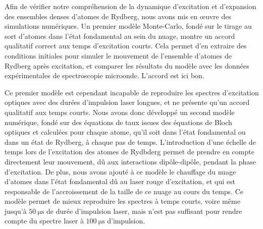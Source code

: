 Afin de vérifier notre compréhension de la dynamique d'excitation et d'expansion des ensembles denses d'atomes de Rydberg, nous avons mis en \oe uvre des simulations numériques.
Un premier modèle Monte-Carlo, fondé sur le tirage au sort d'atomes dans l'état fondamental au sein du nuage, montre un accord qualitatif correct aux temps d'excitation courts.
Cela permet d'en extraire des conditions initiales pour simuler le mouvement de l'ensemble d'atomes de Rydberg après excitation, et comparer les résultats du modèle avec les données expérimentales de spectroscopie microonde.
L'accord est ici bon.

Ce premier modèle est cependant incapable de reproduire les spectres d'excitation optiques avec des durées d'impulsion laser longues, et ne présente qu'un accord qualitatif aux temps courts.
Nous avons donc développé un second modèle numérique, fondé sur des équations de taux issues des équations de Bloch optiques et calculées pour chaque atome, qu'il soit dans l'état fondamental ou dans un état de Rydberg, à chaque pas de temps.
L'introduction d'une échelle de temps lors de l'excitation des atomes de Rydbderg permet de prendre en compte directement leur mouvement, dû aux interactions dipôle-dipôle, pendant la phase d'excitation.
De plus, nous avons ajouté à ce modèle le chauffage du nuage d'atomes dans l'état fondamental dû au laser rouge d'excitation, et qui est responsable de l'accroissement de la taille de ce nuage au cours du temps.
%
%
%
Ce modèle permet de mieux reproduire les spectres à temps courts, voire même jusqu'à $\SI{50}{\us}$ de durée d'impulsion laser, mais n'est pas suffisant pour rendre compte du spectre laser à $\SI{100}{\us}$ d'impulsion.

